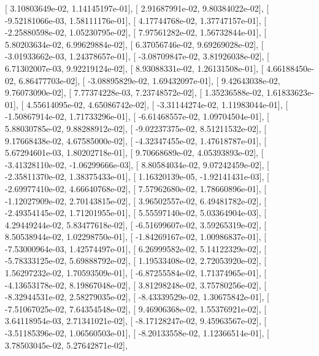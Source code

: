 \documentclass{article}
\begin{document}
       [  3.10803649e-02,   1.14145197e-01],
       [  2.91687991e-02,   9.80384022e-02],
       [ -9.52181066e-03,   1.58111176e-01],
       [  4.17744768e-02,   1.37747157e-01],
       [ -2.25880598e-02,   1.05230795e-02],
       [  7.97561282e-02,   1.56732844e-01],
       [  5.80203634e-02,   6.99629884e-02],
       [  6.37056746e-02,   9.69269028e-02],
       [ -3.01933662e-03,   1.24378657e-01],
       [ -3.08709847e-02,   3.81926038e-02],
       [  6.71302007e-03,   9.92219124e-02],
       [  8.93088331e-02,   1.26131508e-01],
       [  4.66188450e-02,   6.86477703e-02],
       [ -3.08895829e-02,   1.69432097e-01],
       [  9.42643038e-02,   9.76073090e-02],
       [  7.77374228e-03,   7.23748572e-02],
       [  1.35236588e-02,   1.61833623e-01],
       [  4.55614095e-02,   4.65086742e-02],
       [ -3.31144274e-02,   1.11983044e-01],
       [ -1.50867914e-02,   1.71733296e-01],
       [ -6.61468557e-02,   1.09704504e-01],
       [  5.88030785e-02,   9.88288912e-02],
       [ -9.02237375e-02,   8.51211532e-02],
       [  9.17668438e-02,   4.67585000e-02],
       [ -4.32347455e-02,   1.47618787e-01],
       [  5.67294601e-03,   1.80202718e-01],
       [  9.70668689e-02,   4.05393893e-02],
       [ -3.41328110e-02,  -1.06299666e-03],
       [  8.80584034e-02,   9.07242459e-02],
       [ -2.35811370e-02,   1.38375433e-01],
       [  1.16320139e-05,  -1.92141431e-03],
       [ -2.69977410e-02,   4.66640768e-02],
       [  7.57962680e-02,   1.78660896e-01],
       [ -1.12027909e-02,   2.70143815e-02],
       [  3.96502557e-02,   6.49481782e-02],
       [ -2.49354145e-02,   1.71201955e-01],
       [  5.55597140e-02,   5.03364904e-03],
       [  4.29449244e-02,   5.83477618e-02],
       [ -6.51699607e-02,   3.59265319e-02],
       [  8.50538944e-02,   1.02298750e-01],
       [ -1.84269167e-02,   1.00986837e-01],
       [ -7.53000964e-03,   1.42574497e-01],
       [  6.26999582e-02,   5.14122329e-02],
       [ -5.78333125e-02,   5.69888792e-02],
       [  1.19533408e-02,   2.72053920e-02],
       [  1.56297232e-02,   1.70593509e-01],
       [ -6.87255584e-02,   1.71374965e-01],
       [ -4.13653178e-02,   8.19867048e-02],
       [  3.81298248e-02,   3.75780256e-02],
       [ -8.32944531e-02,   2.58279035e-02],
       [ -8.43339529e-02,   1.30675842e-01],
       [ -7.51067025e-02,   7.64354548e-02],
       [  9.46906368e-02,   1.55376921e-02],
       [  3.64118954e-03,   2.71341021e-02],
       [ -8.17128247e-02,   9.45963567e-02],
       [ -3.51185396e-02,   1.06560503e-01],
       [ -8.20133558e-02,   1.12366514e-01],
       [  3.78503045e-02,   5.27642871e-02],
\end{document}
